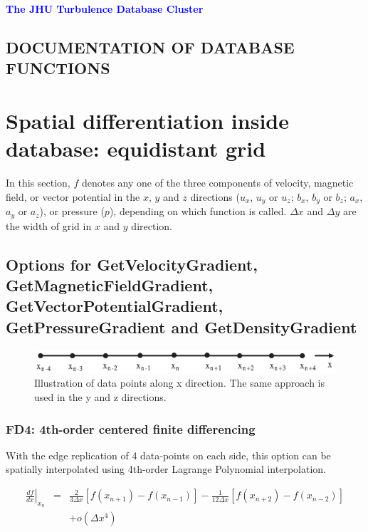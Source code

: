 \documentclass[11pt]{article}
\def\bea{\begin{eqnarray}}
\def\eea{\end{eqnarray}}
\begin{document}
\begin{center}
{\bf \Large \textcolor{blue}{ The JHU Turbulence Database Cluster}}
 \end{center}
 \vskip 1cm
\subsection*{DOCUMENTATION OF DATABASE FUNCTIONS}

\vskip 0.5cm
\section{Spatial differentiation inside database: equidistant grid}

In this section, $f$ denotes any one of the three components of
velocity, magnetic field, or vector potential in the $x$, $y$ and $z$ directions ($u_x$, $u_y$ or $u_z$; $b_x$,
$b_y$ or $b_z$; $a_x$, $a_y$ or $a_z$), or pressure ($p$), depending on which function is called. $\Delta x$ and
$\Delta y$ are the width of grid in $x$ and $y$ direction.

\subsection{Options for GetVelocityGradient, GetMagneticFieldGradient, GetVectorPotentialGradient, GetPressureGradient and GetDensityGradient}

\begin{figure}[h]
\begin{minipage}{\linewidth}
\centering\includegraphics[width=1.0\linewidth]{1DGrid.eps}
\end{minipage} \caption{Illustration of data points along x direction. The same approach is used in the y and z directions.}\label{1DGrid}
\end{figure}

\subsubsection*{FD4: 4th-order centered finite differencing}
\label{sec-FD4}

With the edge replication of 4 data-points on each side, this option can be spatially interpolated using 4th-order Lagrange Polynomial interpolation.

\bea \left.\frac{df}{dx}\right|_{x_n}
&=& \frac{2}{3\Delta x}[f(x_{n+1})-f(x_{n-1})]-\frac{1}{12\Delta
x}[f(x_{n+2})-f(x_{n-2})]\nonumber\\
&&+o(\Delta x^4) \eea
\end{document}
